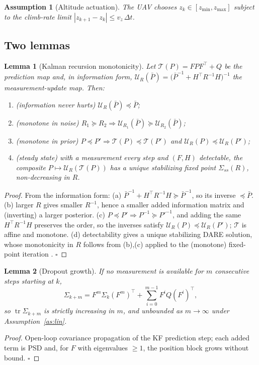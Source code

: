 \documentclass[10pt]{article}
\newtheorem{assumption}{Assumption}
\newtheorem{lemma}{Lemma}
\theoremstyle{remark}\newtheorem{remark}{Remark}
\DeclareMathOperator{\tr}{tr}
\begin{document}
\begin{assumption}[Altitude actuation]\label{as:act}
The UAV chooses $z_k\in[z_{\min},z_{\max}]$ subject to the climb-rate limit
$|z_{k+1}-z_k|\le v_z\,\Delta t$.
\end{assumption}

\subsection*{Two lemmas}

\begin{lemma}[Kalman recursion monotonicity]\label{lem:mono}
Let $\mathcal T(P)=FPF^{\!\top}+Q$ be the prediction map and, in information form,
$\mathcal U_R(\bar P)=\big(\bar P^{-1}+H^{\!\top}R^{-1}H\big)^{-1}$ the measurement-update map.
Then:
\begin{enumerate}
\item[(a)] \emph{(information never hurts)} $\mathcal U_R(\bar P)\preceq\bar P$;
\item[(b)] \emph{(monotone in noise)} $R_1\succeq R_2\Rightarrow\mathcal U_{R_1}(\bar P)\succeq\mathcal U_{R_2}(\bar P)$;
\item[(c)] \emph{(monotone in prior)} $P\preceq P'\Rightarrow\mathcal T(P)\preceq\mathcal T(P')$ and $\mathcal U_R(P)\preceq\mathcal U_R(P')$;
\item[(d)] \emph{(steady state)} with a measurement every step and $(F,H)$ detectable, the
composite $P\mapsto\mathcal U_R(\mathcal T(P))$ has a unique stabilizing fixed point
$\Sigma_{ss}(R)$, non-decreasing in $R$.
\end{enumerate}
\end{lemma}
\begin{proof}
From the information form: (a) $\bar P^{-1}+H^{\!\top}R^{-1}H\succeq\bar P^{-1}$, so its inverse
$\preceq\bar P$. (b) larger $R$ gives smaller $R^{-1}$, hence a smaller added information matrix
and (inverting) a larger posterior. (c) $P\preceq P'\!\Rightarrow P^{-1}\succeq P'^{-1}$, and
adding the same $H^{\!\top}R^{-1}H$ preserves the order, so the inverses satisfy
$\mathcal U_R(P)\preceq\mathcal U_R(P')$; $\mathcal T$ is affine and monotone. (d) detectability
gives a unique stabilizing DARE solution, whose monotonicity in $R$ follows from (b),(c) applied
to the (monotone) fixed-point iteration \cite{andersonmoore}. $\square$
\end{proof}

\begin{lemma}[Dropout growth]\label{lem:drop}
If no measurement is available for $m$ consecutive steps starting at $k$,
\[
\Sigma_{k+m}=F^{m}\Sigma_k (F^{m})^{\!\top}+\textstyle\sum_{i=0}^{m-1}F^{i}Q(F^{i})^{\!\top},
\]
so $\tr\Sigma_{k+m}$ is strictly increasing in $m$, and unbounded as $m\to\infty$ under
Assumption~\ref{as:lin}.
\end{lemma}
\begin{proof}
Open-loop covariance propagation of the KF prediction step; each added term is PSD and, for
$F$ with eigenvalues $\ge 1$, the position block grows without bound. $\square$
\end{proof}
\end{document}
